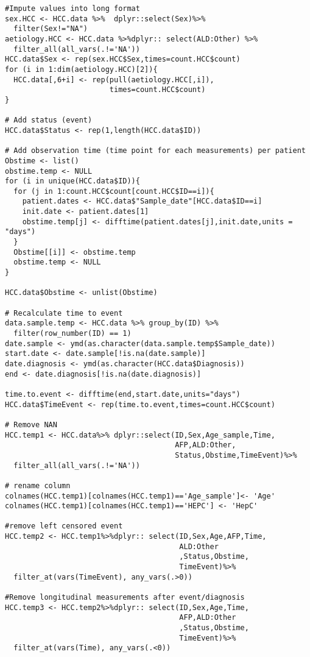 \documentclass[11pt,twoside]{article}
\numberwithin{Theorem}{section}
\numberwithin{Definition}{section}
\numberwithin{Lemma}{section}
\numberwithin{Algorithm}{section}
\numberwithin{equation}{section}
\begin{document}
\begin{lstlisting}
#Impute values into long format
sex.HCC <- HCC.data %>%  dplyr::select(Sex)%>%
  filter(Sex!="NA")
aetiology.HCC <- HCC.data %>%dplyr:: select(ALD:Other) %>%
  filter_all(all_vars(.!='NA'))
HCC.data$Sex <- rep(sex.HCC$Sex,times=count.HCC$count)
for (i in 1:dim(aetiology.HCC)[2]){
  HCC.data[,6+i] <- rep(pull(aetiology.HCC[,i]),
                        times=count.HCC$count)
}

# Add status (event)
HCC.data$Status <- rep(1,length(HCC.data$ID))

# Add observation time (time point for each measurements) per patient
Obstime <- list()
obstime.temp <- NULL
for (i in unique(HCC.data$ID)){
  for (j in 1:count.HCC$count[count.HCC$ID==i]){
    patient.dates <- HCC.data$"Sample_date"[HCC.data$ID==i]
    init.date <- patient.dates[1]
    obstime.temp[j] <- difftime(patient.dates[j],init.date,units = "days")
  }
  Obstime[[i]] <- obstime.temp
  obstime.temp <- NULL
}

HCC.data$Obstime <- unlist(Obstime)

# Recalculate time to event
data.sample.temp <- HCC.data %>% group_by(ID) %>%
  filter(row_number(ID) == 1)
date.sample <- ymd(as.character(data.sample.temp$Sample_date))
start.date <- date.sample[!is.na(date.sample)]
date.diagnosis <- ymd(as.character(HCC.data$Diagnosis))
end <- date.diagnosis[!is.na(date.diagnosis)]

time.to.event <- difftime(end,start.date,units="days")
HCC.data$TimeEvent <- rep(time.to.event,times=count.HCC$count)

# Remove NAN
HCC.temp1 <- HCC.data%>% dplyr::select(ID,Sex,Age_sample,Time,
                                       AFP,ALD:Other,
                                       Status,Obstime,TimeEvent)%>%
  filter_all(all_vars(.!='NA'))

# rename column
colnames(HCC.temp1)[colnames(HCC.temp1)=='Age_sample']<- 'Age'
colnames(HCC.temp1)[colnames(HCC.temp1)=='HEPC'] <- 'HepC'

#remove left censored event
HCC.temp2 <- HCC.temp1%>%dplyr:: select(ID,Sex,Age,AFP,Time,
                                        ALD:Other
                                        ,Status,Obstime,
                                        TimeEvent)%>%
  filter_at(vars(TimeEvent), any_vars(.>0))

#Remove longitudinal measurements after event/diagnosis
HCC.temp3 <- HCC.temp2%>%dplyr:: select(ID,Sex,Age,Time,
                                        AFP,ALD:Other
                                        ,Status,Obstime,
                                        TimeEvent)%>%
  filter_at(vars(Time), any_vars(.<0))


\end{lstlisting}
\end{document}
